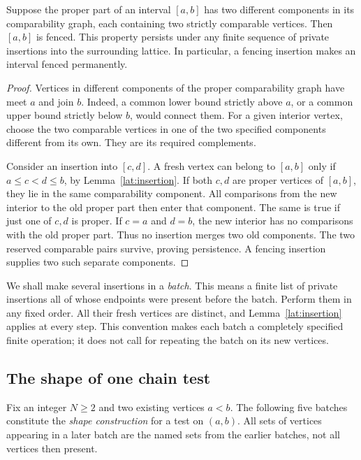 \begin{lemma}
\label{lat:persistent-fence}
Suppose the proper part of an interval $[a,b]$ has two different
components in its comparability graph, each containing two strictly
comparable vertices.  Then $[a,b]$ is fenced.  This property persists
under any finite sequence of private insertions into the surrounding
lattice.  In particular, a fencing insertion makes an interval fenced
permanently.
\end{lemma}

\begin{proof}
Vertices in different components of the proper comparability graph
have meet $a$ and join $b$.  Indeed, a common lower bound strictly above
$a$, or a common upper bound strictly below $b$, would connect them.
For a given interior vertex, choose the two comparable vertices in one
of the two specified components different from its own.  They are its
required complements.

Consider an insertion into $[c,d]$.  A fresh vertex can belong to
$[a,b]$ only if $a\leq c<d\leq b$, by
Lemma~\ref{lat:insertion}.  If both $c,d$ are proper vertices of
$[a,b]$, they lie in the same comparability component.  All comparisons
from the new interior to the old proper part then enter that component.
The same is true if just one of $c,d$ is proper.  If $c=a$ and $d=b$,
the new interior has no comparisons with the old proper part.
Thus no insertion merges two old components.  The two reserved
comparable pairs survive, proving persistence.  A fencing insertion
supplies two such separate components.
\end{proof}

We shall make several insertions in a \emph{batch}.  This means a
finite list of private insertions all of whose endpoints were present
before the batch.  Perform them in any fixed order.  All their fresh
vertices are distinct, and Lemma~\ref{lat:insertion} applies at every
step.  This convention makes each batch a completely specified finite
operation; it does not call for repeating the batch on its new vertices.

\subsection{The shape of one chain test}

Fix an integer $N\geq2$ and two existing vertices $a<b$.  The following
five batches constitute the \emph{shape construction} for a test on
$(a,b)$.  All sets of vertices appearing in a later batch are the named
sets from the earlier batches, not all vertices then present.


